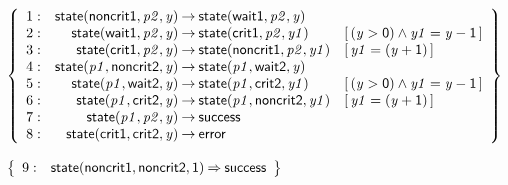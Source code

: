 \documentclass[a4paper]{article}
\def\lthtmlcheckvsize{\ifdim\ht\sizebox<\vsize 
  \ifdim\wd\sizebox<\hsize\expandafter\hfill\fi \expandafter\vfill
  \else\expandafter\vss\fi}%
\begin{document}
{\newpage\clearpage
{}%
$\displaystyle \left\{
\begin{array}{rr@{\>}c@{\>}ll}
\mathrm{1} : 
 & \mathsf{state}(\mathsf{noncrit1},\mathit{p2},\mathit{y})
 & \to 
 & \mathsf{state}(\mathsf{wait1},\mathit{p2},\mathit{y})\\
\par
\mathrm{2} : 
 & \mathsf{state}(\mathsf{wait1},\mathit{p2},\mathit{y})
 & \to 
 & \mathsf{state}(\mathsf{crit1},\mathit{p2},\mathit{y1})
 & [\, (\mathit{y} > \mathsf{0}) \land \mathit{y1} = \mathit{y} - \mathsf{1} \,]\\
\par
\mathrm{3} : 
 & \mathsf{state}(\mathsf{crit1},\mathit{p2},\mathit{y})
 & \to 
 & \mathsf{state}(\mathsf{noncrit1},\mathit{p2},\mathit{y1})
 & [\, \mathit{y1} = (\mathit{y} + \mathsf{1}) \,]\\
\par
\mathrm{4} : 
 & \mathsf{state}(\mathit{p1},\mathsf{noncrit2},\mathit{y})
 & \to 
 & \mathsf{state}(\mathit{p1},\mathsf{wait2},\mathit{y})\\
\par
\mathrm{5} : 
 & \mathsf{state}(\mathit{p1},\mathsf{wait2},\mathit{y})
 & \to 
 & \mathsf{state}(\mathit{p1},\mathsf{crit2},\mathit{y1})
 & [\, (\mathit{y} > \mathsf{0}) \land \mathit{y1} = \mathit{y} - \mathsf{1} \,]\\
\par
\mathrm{6} : 
 & \mathsf{state}(\mathit{p1},\mathsf{crit2},\mathit{y})
 & \to 
 & \mathsf{state}(\mathit{p1},\mathsf{noncrit2},\mathit{y1})
 & [\, \mathit{y1} = (\mathit{y} + \mathsf{1}) \,]\\
\par
\mathrm{7} : 
 & \mathsf{state}(\mathit{p1},\mathit{p2},\mathit{y})
 & \to 
 & \mathsf{success}\\
\par
\mathrm{8} : 
 & \mathsf{state}(\mathsf{crit1},\mathsf{crit2},\mathit{y})
 & \to 
 & \mathsf{error}\\
\par
\end{array}
\right\}
$%
\lthtmlindisplaymathZ
\lthtmlcheckvsize\clearpage}

{\newpage\clearpage
{}%
$\displaystyle \left\{
\begin{array}{rr@{\>}c@{\>}ll}
\mathrm{9} : 
 & \mathsf{state}(\mathsf{noncrit1},\mathsf{noncrit2},\mathsf{1})
 & \Rightarrow 
 & \mathsf{success}\\
\par
\end{array}
\right\}
$%
\lthtmlindisplaymathZ
\lthtmlcheckvsize\clearpage}
\end{document}

